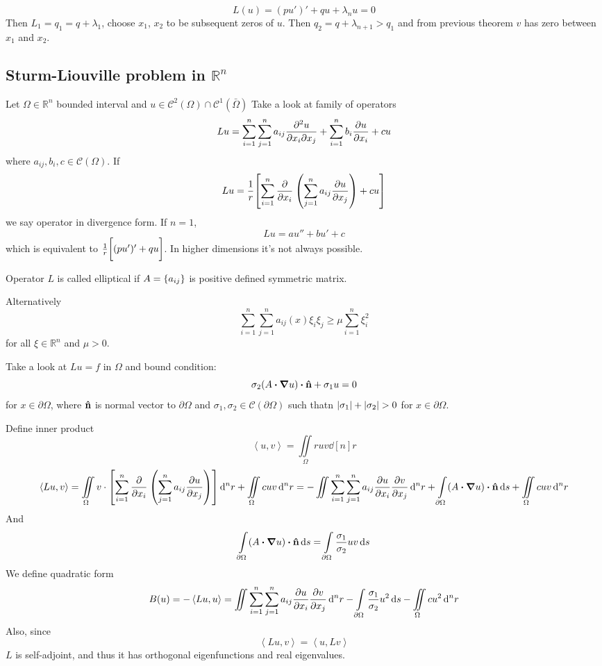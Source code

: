 $$L(u) = (pu')'+qu+\lambda_nu  =0 $$
Then $L_1  =q_1= q +\lambda_1$, choose $x_1$, $x_2$ to be subsequent zeros of $u$. Then $q_2 = q+\lambda_{n+1} > q_1$ and from previous theorem $v$ has zero between $x_1$ and $x_2$.

\subsection{Sturm-Liouville problem in $\mathbb{R}^n$}
Let $\Omega \in \mathbb{R}^n$ bounded interval and
$u \in \mathcal{C}^2(\Omega) \cap \mathcal{C}^1(\bar{ \Omega})$
Take a look at family of operators
$$Lu = \sum_{i=1}^n \sum_{j=1}^n a_{ij} \pdv{u}{x_i}{x_j} + \sum_{i=1}^n b_i \pdv{u}{x_i} +cu$$
where $a_{ij}, b_i, c \in \mathcal{C}(\Omega)$.
If 
$$Lu = \frac{1}{r} \qty[\sum_{i=1}^n \pdv{x_i}\:\qty(\sum_{j=1}^n a_{ij} \pdv{u}{x_j}) + cu]$$
we say operator in divergence form. 
If $n=1$, 
$$Lu = au'' +bu'+c$$
which is equivalent to $\frac{1}{r}\qty\bigg[(pu')'+qu]$. In higher dimensions it's not always possible.


Operator $L$ is called elliptical if $A = \qty{a_{ij}}$ is positive defined symmetric matrix.

Alternatively
$$\sum_{i=1}^n \sum_{j=1}^n a_{ij}(x) \xi_i \xi_j \geq \mu \sum_{i=1}^n \xi_i^2$$ 
for all $\xi \in \mathbb{R}^n$ and $\mu>0$.

Take a look at $Lu = f$ in $\Omega$ and bound condition:
$$\sigma_2 (A \vdot \grad{u}) \vdot \vu{n} + \sigma_1 u = 0$$
for $x\in \partial \Omega$, where $\vu{n}$ is normal vector to $\partial \Omega$ and $\sigma_1, \sigma_2 \in \mathcal{C}(\partial \Omega)$ such thatn $\abs{ \sigma_1}+\abs{ \sigma_2}>0$ for $x\in \partial \Omega$.

Define inner product 
$$\left\langle u,v \right\rangle = \iint\limits_{\Omega} ruv \dd[n]{r}$$
$$\left\langle Lu,v \right\rangle = \iint\limits_{\Omega}v \cdot \qty[\sum_{i=1}^n \pdv{x_i}\:\qty(\sum_{j=1}^n a_{ij} \pdv{u}{x_j})] \dd[n]{r} +\iint\limits_{\Omega} cuv\dd[n]{r} = -\iint \sum_{i=1}^n \sum_{j=1}^n a_{ij} \pdv{u}{x_i} \pdv{v}{x_j} \dd[n]{r} + \int\limits_{\partial \Omega}   (A \vdot \grad{u}) \vdot \vu{n} \dd{s} +\iint\limits_{\Omega} cuv\dd[n]{r} $$
And
$$ \int\limits_{\partial \Omega}   (A \vdot \grad{u}) \vdot \vu{n} \dd{s} = \int\limits_{\partial \Omega}   \frac{\sigma_1}{\sigma_2}uv \dd{s}  $$
We define quadratic form
$$B(u) = -\left\langle Lu,u \right\rangle = \iint \sum_{i=1}^n \sum_{j=1}^n a_{ij} \pdv{u}{x_i} \pdv{v}{x_j} \dd[n]{r} - \int\limits_{\partial \Omega}   \frac{\sigma_1}{\sigma_2}u^2 \dd{s} - \iint\limits_{\Omega} cu^2 \dd[n]{r} $$
Also, since
$$\left\langle Lu,v \right\rangle = \left\langle u,Lv \right\rangle$$
$L$ is self-adjoint, and thus it has orthogonal eigenfunctions and real eigenvalues.
